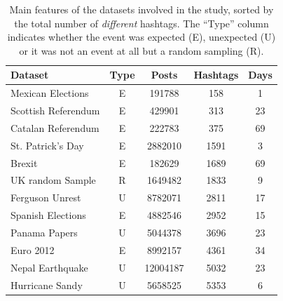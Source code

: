 \begin{table}[t]
\centering
\caption[Main features of the datasets]{Main features of the datasets involved in the study, sorted by the total number of \textit{different} hashtags. The ``Type'' column indicates whether the event was expected (E), unexpected (U) or it was not an event at all but a random sampling (R).}
\label{chp:4:tab}
\begin{tabular}{lcccc}
\hline
\textbf{Dataset}     & \textbf{Type}        & \textbf{Posts} & \textbf{Hashtags} & \textbf{Days} \\ \hline \hline
Mexican Elections  & E   & 191788     & 158                 & 1             \\ \hline
Scottish Referendum  & E & 429901     & 313                 & 23            \\ \hline
Catalan Referendum  & E  & 222783     & 375                 & 69            \\ \hline
St. Patrick's Day  & E  & 2882010    & 1591                & 3             \\ \hline
Brexit           & E     & 182629     & 1689                & 69            \\ \hline
UK random Sample  & R    & 1649482    & 1833                & 9             \\ \hline
Ferguson Unrest    & U   & 8782071    & 2811                & 17            \\ \hline
Spanish Elections  & E   & 4882546    & 2952                & 15            \\ \hline
Panama Papers     & U    & 5044378    & 3696                & 23            \\ \hline
Euro 2012      & E       & 8992157    & 4361                & 34            \\ \hline
Nepal Earthquake  & U    & 12004187   & 5032                & 23            \\ \hline
Hurricane Sandy   & U   & 5658525    & 5353                & 6            \\ \hline
\end{tabular}
\end{table}


